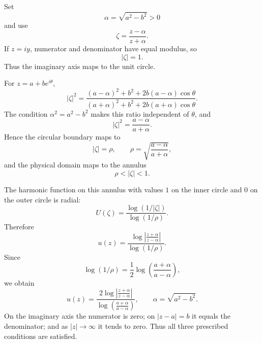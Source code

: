 

\begin{solution}
Set
\[
\alpha=\sqrt{a^2-b^2}>0
\]
and use
\[
\zeta=\frac{z-\alpha}{z+\alpha}.
\]
If \(z=iy\), numerator and denominator have equal modulus, so
\[
|\zeta|=1.
\]
Thus the imaginary axis maps to the unit circle.

For \(z=a+be^{i\theta}\),
\[
|\zeta|^2
=
\frac{(a-\alpha)^2+b^2+2b(a-\alpha)\cos\theta}
{(a+\alpha)^2+b^2+2b(a+\alpha)\cos\theta}.
\]
The condition \(\alpha^2=a^2-b^2\) makes this ratio independent of \(\theta\), and
\[
|\zeta|^2
=
\frac{a-\alpha}{a+\alpha}.
\]
Hence the circular boundary maps to
\[
|\zeta|=\rho,
\qquad
\rho=
\sqrt{\frac{a-\alpha}{a+\alpha}},
\]
and the physical domain maps to the annulus
\[
\rho<|\zeta|<1.
\]

The harmonic function on this annulus with values \(1\) on the inner circle and \(0\) on the outer circle is radial:
\[
U(\zeta)
=
\frac{\log(1/|\zeta|)}{\log(1/\rho)}.
\]
Therefore
\[
u(z)
=
\frac{\log\left|\frac{z+\alpha}{z-\alpha}\right|}
{\log(1/\rho)}.
\]
Since
\[
\log(1/\rho)
=
\frac12
\log\left(\frac{a+\alpha}{a-\alpha}\right),
\]
we obtain
\[
\boxed{
u(z)
=
\frac{
2\log\left|\frac{z+\alpha}{z-\alpha}\right|
}{
\log\left(\frac{a+\alpha}{a-\alpha}\right)
},
\qquad
\alpha=\sqrt{a^2-b^2}.
}
\]
On the imaginary axis the numerator is zero; on \(|z-a|=b\) it equals the denominator; and as \(|z|\to\infty\) it tends to zero. Thus all three prescribed conditions are satisfied.
\end{solution}


